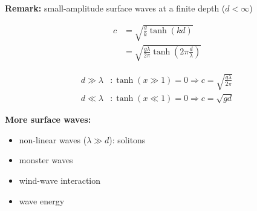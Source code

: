 \begin{framed}
\textbf{Remark:} small-amplitude surface waves at a finite depth ($d<\infty$)

\begin{align}
c &= \sqrt{\frac{g}{k}\tanh(kd)}\\
&= \sqrt{\frac{g\lambda}{2\pi}\tanh\left(2\pi\frac{d}{\lambda}\right)}
\end{align}

\begin{align}
d\gg\lambda&: \tanh(x\gg1)=0  \Rightarrow c=\sqrt{\frac{g\lambda}{2\pi}}\\
d\ll\lambda&: \tanh(x\ll1)=0 \Rightarrow c=\sqrt{gd}
\end{align}
\end{framed}

\textbf{More surface waves:}

\begin{itemize}
\item non-linear waves ($\lambda\gg d$): solitons
\item monster waves
\item wind-wave interaction
\item wave energy
\end{itemize}